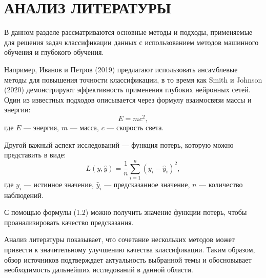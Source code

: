 \chapter{АНАЛИЗ ЛИТЕРАТУРЫ}

В данном разделе рассматриваются основные методы и подходы, применяемые для решения задач классификации данных с использованием методов машинного обучения и глубокого обучения.

Например, Иванов и Петров (2019) предлагают использовать ансамблевые методы для повышения точности классификации, в то время как Smith и Johnson (2020) демонстрируют эффективность применения глубоких нейронных сетей. Один из известных подходов описывается через формулу взаимосвязи массы и энергии:
\begin{equation}
E = mc^2,
\end{equation}
где \(E\) --- энергия, \(m\) --- масса, \(c\) --- скорость света.

Другой важный аспект исследований --- функция потерь, которую можно представить в виде:
\begin{equation}
L(y, \hat{y}) = \frac{1}{n} \sum_{i=1}^{n} (y_i - \hat{y}_i)^2,
\end{equation}
где \(y_i\) --- истинное значение, \(\hat{y}_i\) --- предсказанное значение, \(n\) --- количество наблюдений.

С помощью формулы (1.2) можно получить значение функции потерь, чтобы проанализировать качество предсказания. 

Анализ литературы показывает, что сочетание нескольких методов может привести к значительному улучшению качества классификации. Таким образом, обзор источников подтверждает актуальность выбранной темы и обосновывает необходимость дальнейших исследований в данной области.

